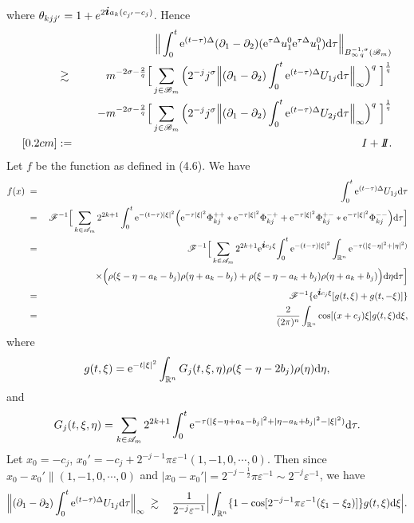 \documentclass[11pt]{article}
\newcommand{\rmd}{\mbox{\rm d}}
\newcommand{\bfi}{{\mbox{\boldmath $i$}}}
\newcommand{\rme}{{\rm e}}
\begin{document}
  where $\theta_{kjj'}=1+e^{2{\bfi}a_k(c_{j'}-c_j)}$. Hence
\begin{eqnarray}
  &&\Big\|\int_0^t\rme^{(t-\tau)\Delta}(\partial_1-\partial_2)(\rme^{\tau\Delta}u_1^0\rme^{\tau\Delta}u_1^0)\rmd\tau
  \Big\|_{B^{-1,\sigma}_{\infty\,q}(\mathscr{B}_m)}
\nonumber\\
  &\gtrsim\; &m^{-2\sigma-\frac{2}{q}}\Big[\sum_{j\in\mathscr{B}_m}\Big(2^{-j}j^{\sigma}
  \Big\|(\partial_1-\partial_2)\int_0^t\rme^{(t-\tau)\Delta}U_{1j}\rmd\tau\Big\|_{\infty}\Big)^q\;\Big]^{\frac{1}{q}}
\nonumber\\
  &&\quad -m^{-2\sigma-\frac{2}{q}}\Big[\sum_{j\in\mathscr{B}_m}\Big(2^{-j}j^{\sigma}
  \Big\|(\partial_1-\partial_2)\int_0^t\rme^{(t-\tau)\Delta}U_{2j}\rmd\tau\Big\|_{\infty}\Big)^q\;\Big]^{\frac{1}{q}}
\nonumber\\ [0.2cm]
  &:=\; &I+I\!\!I.
\end{eqnarray}
  Let $f$ be the function as defined in (4.6). We have
\begin{eqnarray*}
  f(x)&\;=\;&\int_0^t\rme^{(t-\tau)\Delta}U_{1j}\rmd\tau
\\
  &\;=\;&\mathscr{F}^{-1}\Big[\sum_{k\in\mathscr{A}_m}2^{2k+1}\int_0^t\rme^{-(t-\tau)|\xi|^2}\Big(\rme^{-\tau|\xi|^2}\Phi_{kj}^{++}
  \ast\rme^{-\tau|\xi|^2}\Phi_{kj}^{-+}+\rme^{-\tau|\xi|^2}\Phi_{kj}^{+-}\ast\rme^{-\tau|\xi|^2}\Phi_{kj}^{--}\Big)\rmd\tau\Big]
\\
  &\;=\;&\mathscr{F}^{-1}\Big[\sum_{k\in\mathscr{A}_m}2^{2k+1}\rme^{\bfi c_j\xi}\!\int_0^t\rme^{-(t-\tau)|\xi|^2}
  \int_{\mathbb{R}^n}\rme^{-\tau(|\xi-\eta|^2+|\eta|^2)}
\\
  &&\quad \times\Big(\rho(\xi-\eta-a_k-b_j)\rho(\eta+a_k-b_j)+\rho(\xi-\eta-a_k+b_j)\rho(\eta+a_k+b_j)\Big)\rmd\eta\rmd\tau\Big]
\\
   &\;=\;&\mathscr{F}^{-1}\{\rme^{\bfi c_j\xi}[g(t,\xi)+g(t,-\xi)]\}
\\
  &\;=\;&\frac{2}{(2\pi)^n}\int_{\mathbb{R}^n}\cos[(x+c_j)\xi]g(t,\xi)\rmd\xi,
\end{eqnarray*}
  where
$$
  g(t,\xi)=\rme^{-t|\xi|^2}\int_{\mathbb{R}^n}G_{j}(t,\xi,\eta)\rho(\xi-\eta-2b_j)\rho(\eta)\rmd\eta,
$$
  and
$$
  G_{j}(t,\xi,\eta)=\sum_{k\in\mathscr{A}_m}2^{2k+1}\int_0^t\rme^{-\tau(|\xi-\eta+a_k-b_j|^2+|\eta-a_k+b_j|^2-|\xi|^2)}\rmd\tau.
$$
  Let $x_0=-c_j$, $x_0'=-c_j+2^{-j-1}\pi\varepsilon^{-1}(1,-1,0,\cdots,0)$. Then since $x_0-x_0'\parallel (1,-1,0,\cdots,0)$ and
  $|x_0-x_0'|=2^{-j-\frac{1}{2}}\pi\varepsilon^{-1}\sim 2^{-j}\varepsilon^{-1}$, we have
\begin{eqnarray*}
  \Big\|(\partial_1-\partial_2)\int_0^t\rme^{(t-\tau)\Delta}U_{1j}\rmd\tau\Big\|_{\infty}
  &\;\gtrsim\;&\frac{1}{2^{-j}\varepsilon^{-1}}\Big|\int_{\mathbb{R}^n}\{1-\cos[2^{-j-1}\pi\varepsilon^{-1}(\xi_1-\xi_2)]\}
  g(t,\xi)\rmd\xi\Big|.
\end{eqnarray*}
\end{document}
